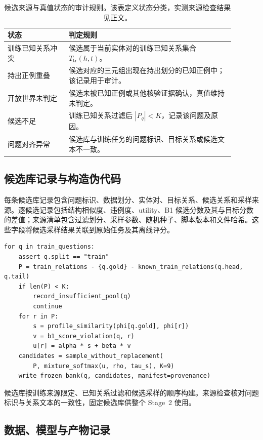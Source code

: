 \begin{table}[htbp]
\caption{候选来源与真值状态的审计规则。该表定义状态分类，实测来源检查结果见正文。}
\label{tab:audit-states}
\centering\small
\begin{tabular}{p{0.24\linewidth}p{0.65\linewidth}}
\toprule
状态 & 判定规则 \\
\midrule
训练已知关系冲突 & 候选属于当前实体对的训练已知关系集合 $T_{\mathrm{tr}}(h,t)$。 \\
持出正例重叠 & 候选对应的三元组出现在持出划分的已知正例中；该记录用于审计。 \\
开放世界未判定 & 候选未被已知正例或其他核验证据确认，真值维持未判定。 \\
候选不足 & 训练已知关系过滤后 $|P_q|<K$，记录该问题及原因。 \\
问题对齐异常 & 候选库与训练任务的问题标识、目标关系或候选文本不一致。 \\
\bottomrule
\end{tabular}
\end{table}

\subsection{候选库记录与构造伪代码}

每条候选库记录包含问题标识、数据划分、实体对、目标关系、候选关系和采样来源。逐候选记录包括结构相似度、违例度、utility、B1 候选分数及其与目标分数的差值；来源清单包含过滤划分、采样参数、随机种子、脚本版本和文件哈希。这些字段将候选采样结果关联到原始任务及其离线评分。

{\small
\begin{verbatim}
for q in train_questions:
    assert q.split == "train"
    P = train_relations - {q.gold} - known_train_relations(q.head, q.tail)
    if len(P) < K:
        record_insufficient_pool(q)
        continue
    for r in P:
        s = profile_similarity(phi[q.gold], phi[r])
        v = b1_score_violation(q, r)
        u[r] = alpha * s + beta * v
    candidates = sample_without_replacement(
        P, mixture_softmax(u, rho, tau_s), K=9)
    write_frozen_bank(q, candidates, manifest=provenance)
\end{verbatim}
}

候选库按训练来源限定、已知关系过滤和候选采样的顺序构建。来源检查核对问题标识与关系文本的一致性，固定候选库供整个 Stage~2 使用。

\subsection{数据、模型与产物记录}

